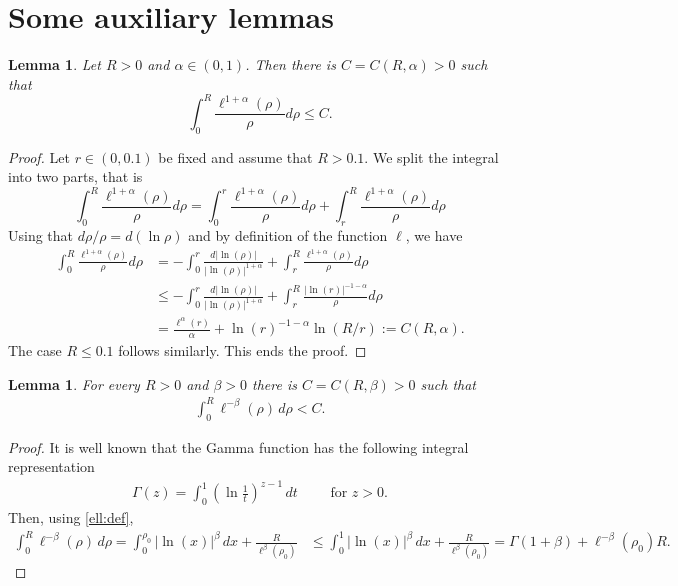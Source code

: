 \documentclass[11 pt]{article}
\newtheorem{lemma}[theorem]{Lemma}
\numberwithin{equation}{section}
\begin{document}
\section{Some auxiliary lemmas}
%
\begin{lemma}\label{lem:over}
Let $R>0$ and $\alpha\in(0,1)$. Then there is $C=C(R,\alpha)>0$ such that 
%
\begin{equation}
    \int_0^{R} \frac{\ell^{1+\alpha}(\rho)}{\rho}d\rho\leq C.
\end{equation}
%
\end{lemma}
%
\begin{proof}
Let $r\in(0,0.1)$ be fixed and assume that $R>0.1$. We split the integral into two parts, that is
%
\begin{equation*}
    \int_{0}^{R}\frac{\ell^{1+\alpha}(\rho)}{\rho}d\rho=\int_{0}^{r} \frac{\ell^{1+\alpha}(\rho)}{\rho}d\rho + \int_{r}^{R}\frac{\ell^{1+\alpha}(\rho)}{\rho}d\rho
\end{equation*}
%
Using that $d\rho/\rho=d(\ln \rho)$ and by definition of the function $\ell$, we have
%
\begin{align*}
    \int_{0}^{R}\frac{\ell^{1+\alpha}(\rho)}{\rho}d\rho &=-\int_{0}^{r} \frac{d|\ln(\rho)|}{|\ln(\rho)|^{1+\alpha}} + \int_{r}^{R}\frac{\ell^{1+\alpha}(\rho)}{\rho}d\rho 
    \\ &\leq -\int_{0}^{r} \frac{d|\ln(\rho)|}{|\ln(\rho)|^{1+\alpha}} + \int_{r}^{R}\frac{|\ln(r)|^{-1-\alpha}}{\rho}d\rho \\
    &=\frac{\ell^\alpha(r)}{\alpha}+\ln(r)^{-1-\alpha}\ln(R/r):=C(R,\alpha).
\end{align*}
%
The case $R\leq 0.1$ follows similarly. This ends the proof. 
\end{proof}

\begin{lemma}\label{lem:ellbeta}
For every $R>0$ and $\beta>0$ there is $C=C(R,\beta)>0$ such that
\begin{align*}
\int_0^R \ell^{-\beta}(\rho)\, d\rho<C.
\end{align*}
\end{lemma}
\begin{proof}
 It is well known that the Gamma function has the following integral representation
 \begin{align*}
     \Gamma(z)=\int_0^1\left(\ln \frac{1}{t}\right)^{z-1}\, dt\qquad \text{ for }z>0.
 \end{align*}
Then, using \eqref{ell:def},
\begin{align*}
\int_0^R \ell^{-\beta}(\rho)\,d\rho
=
\int_0^{\rho_0} |\ln(x)|^{\beta}\,dx
+
\frac{R}{\ell^{\beta}(\rho_0)}
&\leq 
\int_0^{1} |\ln(x)|^{\beta}\,dx
+
\frac{R}{\ell^{\beta}(\rho_0)}=\Gamma(1+\beta)+\ell^{-\beta}(\rho_0)R.
\end{align*}
\end{proof}
\end{document}

